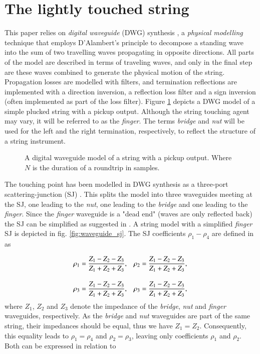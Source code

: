 \documentclass{sigchi}
\begin{document}
\section{The lightly touched string}

This paper relies on \textit{digital waveguide} (DWG) synthesis \cite{smith_physical_1992}, a \textit{physical modelling} technique that employs D'Alambert's principle to decompose a standing wave into the sum of two travelling waves propagating in opposite directions. All parts of the model are described in terms of traveling waves, and only in the final step are these waves combined to generate the physical motion of the string. Propagation losses are modelled with filters, and termination reflections are implemented with a direction inversion, a reflection loss filter and a sign inversion (often implemented as part of the loss filter). Figure \ref{fig:pickup} depicts a DWG model of a simple plucked string with a pickup output. Although the string touching agent may vary, it will be referred to as the \textit{finger}. The terms \textit{bridge} and \textit{nut} will be used for the left and the right termination, respectively, to reflect the structure of a string instrument.

\begin{figure}[h]
	\centering
	\scalebox{0.75}{}
	\caption{A digital waveguide model of a string with a pickup output. Where $N$ is the duration of a roundtrip in samples.}
	\label{fig:pickup}
\end{figure}

The touching point has been modelled in DWG synthesis as a three-port scattering-junction (SJ) \cite{scavone_digital_1997, valimaki_modeling_1993}. This splits the model into three waveguides meeting at the SJ, one leading to the \textit{nut}, one leading to the \textit{bridge} and one leading to the \textit{finger}. Since the \textit{finger} waveguide is a "dead end" (waves are only reflected back) the SJ can be simplified as suggested in \cite{pakarinen_physical_2005}. A string model with a simplified \textit{finger} SJ is depicted in fig. \ref{fig:waveguide_sj}. The SJ coefficients $\rho_1 - \rho_4$ are defined in \cite{pakarinen_physical_2005} as

\begin{align} \label{eq:rhoCoeff}
	\rho_1& = \frac{Z_1-Z_2-Z_3}{Z_1+Z_2+Z_3},&
	\rho_2& = \frac{Z_1-Z_2-Z_3}{Z_1+Z_2+Z_3},\notag\\[1em]
	\rho_3& = \frac{Z_1-Z_2-Z_3}{Z_1+Z_2+Z_3},&
	\rho_3& = \frac{Z_1-Z_2-Z_3}{Z_1+Z_2+Z_3},
\end{align}
where $Z_1$, $Z_2$ and $Z_3$ denote the impedance of the \textit{bridge}, \textit{nut} and \textit{finger} waveguides, respectively. As the \textit{bridge} and \textit{nut} waveguides are part of the same string, their impedances should be equal, thus we have $Z_1=Z_2$. Consequently, this equality leads to $\rho_1=\rho_4$ and $\rho_2=\rho_3$, leaving only coefficients $\rho_1$ and $\rho_2$. Both can be expressed in relation to
\end{document}

